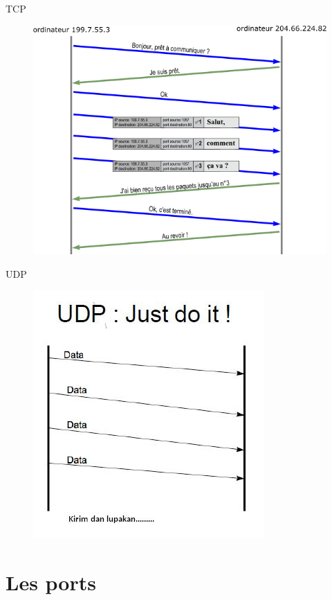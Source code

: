 \documentclass{beamer}
\begin{document}
	\begin{frame}{TCP}
		\begin{figure}
			\includegraphics[scale=0.4]{TCPSimple.png}
		\end{figure}
	\end{frame}

	\begin{frame}{UDP}
		\begin{figure}
			\includegraphics[scale=0.6]{udpsimple.jpg}
		\end{figure}
	\end{frame}

\section{Les ports}
\end{document}
